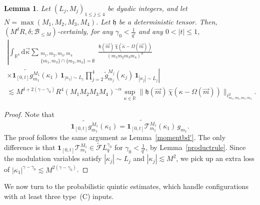 \documentclass[11pt,reqno,english]{amsart}
\numberwithin{equation}{section}
\theoremstyle{plain}
\newtheorem{lemma}[theorem]{Lemma}
\theoremstyle{definition}
\theoremstyle{remark}
\newcommand{\R}{\mathbb{R}}
\newcommand{\dd}{\mathrm{d}}
\begin{document}
\begin{lemma}\label{lem:momentnew}
	Let $(L_j,M_j)_{1\leq j\leq 4}$  be dyadic integers, and let $N=\max(M_1,M_2,M_3,M_4)$.
Let $\mathfrak{h}$ be a deterministic tensor.
Then, $(M^{\delta}R,\delta;\mathcal{B}_{\leq M})$-certainly,
for any $\gamma_0<\frac{1}{q'}$ and any $0<|t|\leq 1$,
\begin{multline*}
		\left|\int_{\R^4}\dd\vec{\kappa}\sum_{\substack{m_1,m_2,m_3,m_4\\
				\{m_1,m_3\}\cap\{m_2,m_4\}=\emptyset}}
		\frac{\mathfrak{h}(\vec{m})\,\widehat{\chi}(\widetilde{\kappa}-\Omega(\vec{m}))}{(m_1 m_2 m_3 m_4)^{\alpha}}\right.\\
		\left.\times
		\widetilde{\mathbf{1}_{[0,t]}g_{m_1}^{M_1}}(\kappa_1)\,\mathbf{1}_{|\kappa_1|\sim L_1}\prod_{j=2}^4\widetilde{g}^{M_j}_{m_j}(\kappa_j)\,\mathbf{1}_{|\kappa_j|\sim L_j}
		\right|\\
		\lesssim
		M^{\delta+2(\gamma-\gamma_0)}R^4
		(M_{1}M_{2}M_{3}M_{4})^{-\alpha}\sup_{\kappa\in\R}\|\mathfrak{h}(\vec{m})\,\widehat{\chi}(\kappa-\Omega(\vec{m}))\|_{\ell_{m_1,m_2,m_3,m_4}^2}.
	\end{multline*}
\end{lemma}

\begin{proof}
	Note that
	\[
	\widetilde{\mathbf{1}_{[0,t]}g_{m_1}^{M_1}}(\kappa_1)=\widetilde{\mathbf{1}_{[0,t]}\mathcal{T}_{m_1}^{M_1}}(\kappa_1)\, g_{m_1}.
	\]
	The proof follows the same argument as Lemma~\ref{momentbd'}. The only difference is that $\mathbf{1}_{[0,t]}\mathcal{T}_{m_1}^{M_1}\in \widetilde{\mathcal{F}}L_q^{\gamma_0}$ for $\gamma_0<\frac{1}{q'}$, by Lemma~\ref{productrule}. Since the modulation variables satisfy $|\kappa_j|\sim L_j$ and $|\kappa_j|\lesssim M^2$, we pick up an extra loss of $|\kappa_1|^{\gamma-\gamma_0}\lesssim M^{2(\gamma-\gamma_0)}$.
\end{proof}

We now turn to the probabilistic quintic estimates, which handle configurations with at least three type~(C) inputs.
\end{document}
